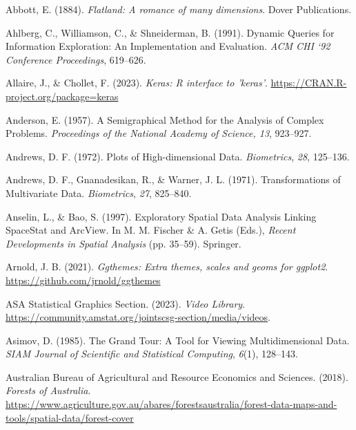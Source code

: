 \documentclass[
  letterpaper,
]{krantz}
\newlength{\cslhangindent}
\newenvironment{CSLReferences}[2] %
 {\begin{list}{}{%
  \setlength{\itemindent}{0pt}
  \setlength{\leftmargin}{0pt}
  \setlength{\parsep}{0pt}
  \ifodd #1
   \setlength{\leftmargin}{\cslhangindent}
   \setlength{\itemindent}{-1\cslhangindent}
  \fi
  \setlength{\itemsep}{#2\baselineskip}}}
 {\end{list}}
\begin{document}
\label{refs}
\begin{CSLReferences}{1}{0}
Abbott, E. (1884). \emph{Flatland: A romance of many dimensions}. Dover
Publications.

Ahlberg, C., Williamson, C., \& Shneiderman, B. (1991). Dynamic
{Q}ueries for {I}nformation {E}xploration: {A}n {I}mplementation and
{E}valuation. \emph{ACM CHI `92 Conference Proceedings}, 619--626.

Allaire, J., \& Chollet, F. (2023). \emph{Keras: {R} interface to
'keras'}. \url{https://CRAN.R-project.org/package=keras}

Anderson, E. (1957). A {S}emigraphical {M}ethod for the {A}nalysis of
{C}omplex {P}roblems. \emph{Proceedings of the National Academy of
Science, 13}, 923--927.

Andrews, D. F. (1972). {P}lots of {H}igh-dimensional {D}ata.
\emph{Biometrics}, \emph{28}, 125--136.

Andrews, D. F., Gnanadesikan, R., \& Warner, J. L. (1971).
{T}ransformations of {M}ultivariate {D}ata. \emph{Biometrics},
\emph{27}, 825--840.

Anselin, L., \& Bao, S. (1997). {E}xploratory {S}patial {D}ata
{A}nalysis {L}inking {S}pace{S}tat and {A}rc{V}iew. In M. M. Fischer \&
A. Getis (Eds.), \emph{{R}ecent {D}evelopments in {S}patial {A}nalysis}
(pp. 35--59). Springer.

Arnold, J. B. (2021). \emph{Ggthemes: Extra themes, scales and geoms for
ggplot2}. \url{https://github.com/jrnold/ggthemes}

ASA Statistical Graphics Section. (2023). \emph{Video {L}ibrary}.
\url{https://community.amstat.org/jointscsg-section/media/videos}.

Asimov, D. (1985). {T}he {G}rand {T}our: {A} {T}ool for {V}iewing
{M}ultidimensional {D}ata. \emph{SIAM Journal of Scientific and
Statistical Computing}, \emph{6}(1), 128--143.

Australian Bureau of Agricultural and Resource Economics and Sciences.
(2018). \emph{{Forests of Australia}}.
\url{https://www.agriculture.gov.au/abares/forestsaustralia/forest-data-maps-and-tools/spatial-data/forest-cover}


\end{CSLReferences}
\end{document}
